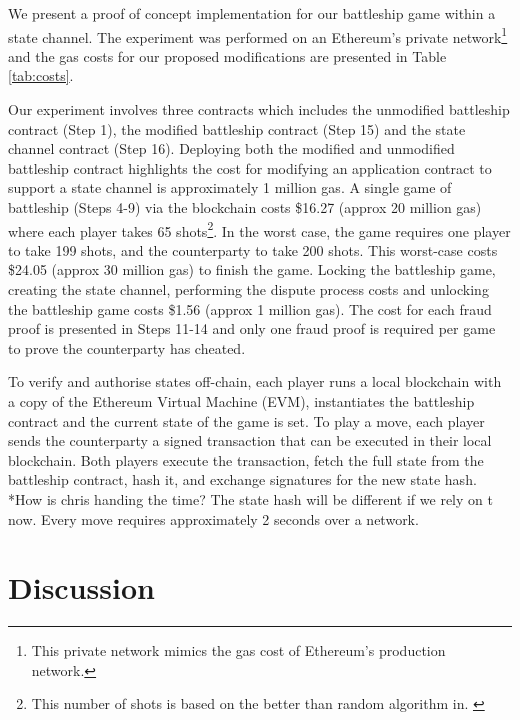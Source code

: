\documentclass{llncs}
\newcommand{\battleshipbegin}{\mathsf{BS.begingame}}
\begin{document}
We present a proof of concept implementation for our battleship game within a state channel.
The experiment was performed on an Ethereum's private network\footnote{This private network mimics the gas cost of Ethereum's production network.} and the gas costs for our proposed modifications are presented in Table \ref{tab:costs}. 

Our experiment involves three contracts which includes the unmodified battleship contract (Step 1), the modified battleship contract (Step 15) and the state channel contract (Step 16). 
Deploying both the modified and unmodified battleship contract highlights the cost for modifying an application contract to support a state channel is approximately 1 million gas. 
A single game of battleship (Steps 4-9) via the blockchain costs \$16.27 (approx 20 million gas) where each player takes 65 shots\footnote{This number of shots is based on the better than random algorithm in. \cite{battleshipdata}}.
In the worst case, the game requires one player to take 199 shots, and the counterparty to take 200 shots. 
This worst-case costs \$24.05 (approx 30 million gas) to finish the game.  
Locking the battleship game, creating the state channel, performing the dispute process costs and unlocking the battleship game costs \$1.56 (approx 1 million gas). 
The cost for each fraud proof is presented in Steps 11-14 and only one fraud proof is required per game to prove the counterparty has cheated. 

To verify and authorise states off-chain, each player runs a local blockchain with a copy of the Ethereum Virtual Machine (EVM), instantiates the battleship contract and the current state of the game is set. 
To play a move, each player sends the counterparty a signed transaction that can be executed in their local blockchain. 
Both players execute the transaction, fetch the full state from the battleship contract, hash it, and exchange signatures for the new state hash. 
*How is chris handing the time? The state hash will be different if we rely on t now. 
Every move requires approximately 2 seconds over a network. 


\section{Discussion} 


%
%
\end{document}
